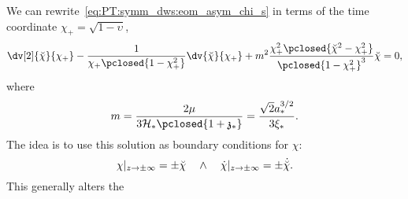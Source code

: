 We can rewrite~\cref{eq:PT:symm_dws:eom_asym_chi_s} in terms of the time coordinate $\chi_+ =\sqrt{1-\upsilon}$,
\begin{equation}%
    \dv[2]{\brchi}{\chi_+} - \frac{1}{\chi_+ \pclosed{1-\chi_+^2}} \dv{\brchi}{\chi_+} + m^2 \frac{\chi_+^2 \pclosed{\brchi^2-\chi_+^2}}{\pclosed{1-\chi_+^2}^3}\brchi = 0,
\end{equation}
where
\begin{equation}%
    m= \frac{2\mu}{3\mathcal{H}_\ast \pclosed{1+\mathfrak{z}_\ast}} = \frac{\sqrt{2}a_\ast^{3/2}}{3\xi_\ast}.
\end{equation}
The idea is to use this solution as boundary conditions for $\chi$:
\begin{equation}
    \chi|_{z\to \pm\infty} =\pm \breve{\chi} \quad \land \quad \dot{\chi}|_{z\to \pm\infty} =\pm \dot{\breve{\chi}}.
\end{equation}
This generally alters the \blahblah
{}
